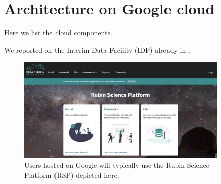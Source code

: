 \section{Architecture on Google cloud} \label{sec:google}

Here we list the cloud components.

We reported on the Interim Data Facility (IDF) already in \cite{DMTN-209}.


\begin{figure}
\begin{centering}
\includegraphics[width=0.9\textwidth]{RSP.png}
	\caption{ Users hosted on Google will typically use the Rubin Science Platform (RSP) depicted here.  \label{fig:goglearch}}
\end{centering}
\end{figure}
